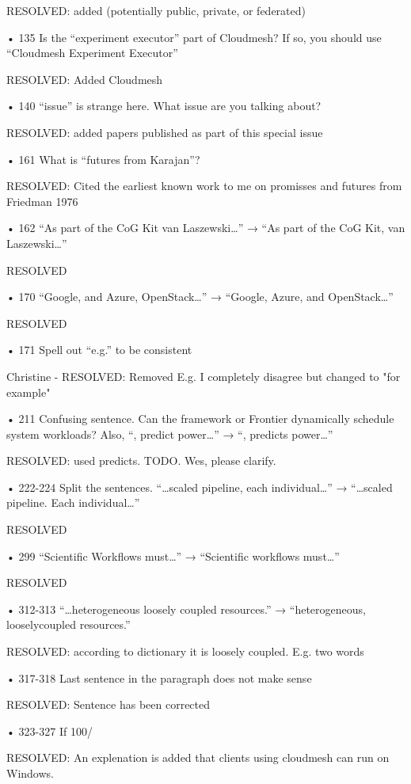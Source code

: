     RESOLVED: added (potentially public, private, or federated)
    
• 135 Is the “experiment executor” part of Cloudmesh? If so, you should use “Cloudmesh
Experiment Executor”

    RESOLVED: Added Cloudmesh

• 140 “issue” is strange here. What issue are you talking about?

    RESOLVED: added papers published as part of this special issue
    
• 161 What is “futures from Karajan”?

    RESOLVED: Cited the earliest known work to me on promisses and futures from Friedman 1976
    
• 162 “As part of the CoG Kit van Laszewski…” → “As part of the CoG Kit, van
Laszewski…”

    RESOLVED 
    
• 170 “Google, and Azure, OpenStack…” → “Google, Azure, and OpenStack…”

    RESOLVED
    
• 171 Spell out “e.g.” to be consistent

    Christine - RESOLVED: Removed E.g.
    I completely disagree but changed to "for example"
    
• 211 Confusing sentence. Can the framework or Frontier dynamically schedule system
workloads? Also, “, predict power…” → “, predicts power…”

    RESOLVED: used predicts. 
    TODO. Wes, please clarify. 

• 222-224 Split the sentences. “…scaled pipeline, each individual…” → “…scaled
pipeline. Each individual…”

    RESOLVED

• 299 “Scientific Workflows must…” → “Scientific workflows must…”

    RESOLVED

• 312-313 “…heterogeneous loosely coupled resources.” → “heterogeneous, looselycoupled resources.”

    RESOLVED: according to dictionary it is loosely coupled. E.g. two words

• 317-318 Last sentence in the paragraph does not make sense

    RESOLVED: Sentence has been corrected
    
• 323-327 If 100/%

    RESOLVED: An explenation is added that clients using cloudmesh can run on Windows.
    
